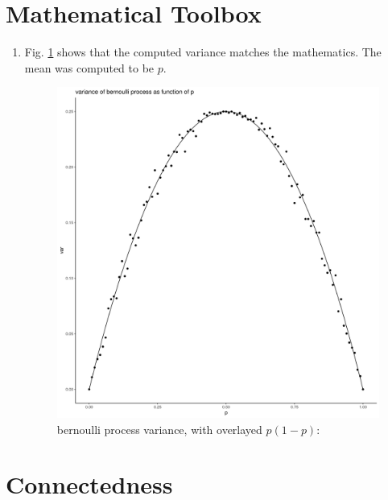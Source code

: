 \documentclass[a4paper]{article}
\begin{document}
\section{Mathematical Toolbox}

\begin{enumerate}[label={(2. \alph*)}]
    \item
        Fig. \ref{fig:bern} shows that the computed variance matches the mathematics. The mean was computed to be $p$. 
        \begin{figure}
            \includegraphics[width=\linewidth]{./bernoulli_var.png}
            \caption{bernoulli process variance, with overlayed $p(1-p)$:}
            \label{fig:bern}
        \end{figure}

\end{enumerate}

\section{Connectedness}


\end{document}
